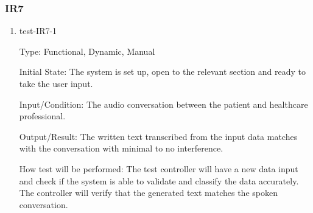 \documentclass[12pt, titlepage]{article}
\begin{document}
\subsubsection{IR7}
    
\begin{enumerate}


    \item{test-IR7-1} \label{test-IR7-1} %
    
    Type: Functional, Dynamic, Manual
    
    Initial State: The system is set up, open to the relevant section and ready to take the user input.
    
    Input/Condition: The audio conversation between the patient and healthcare professional.
    
    Output/Result: The written text transcribed from the input data matches with the conversation with minimal to no interference.

    How test will be performed: The test controller will have a new data input and check if the system is able to validate and classify the data accurately. The controller will verify that the generated text matches the spoken conversation.

\end{enumerate}

\newpage
\end{document}
